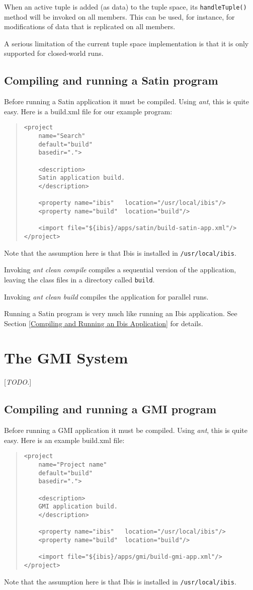 \documentclass[10pt]{article}
\newcommand{\mysection}[1]{\section{#1}\label{#1}}
\newcommand{\mysubsection}[1]{\subsection{#1}\label{#1}}
\newcommand{\remark}[1]{[\emph{#1}]}
\begin{document}
When an active tuple is added (as data) to the tuple space,
its \texttt{handleTuple()} method will be invoked on all members.
This can be used, for instance, for modifications of data that
is replicated on all members.

A serious limitation of the current tuple space implementation is that
it is only supported for closed-world runs.

\mysubsection{Compiling and running a Satin program}

Before running a Satin application it must be compiled.
Using \emph{ant}, this is quite easy. Here is a build.xml file for
our example program:

\begin{quote}
\begin{verbatim}
<project
    name="Search"
    default="build"
    basedir=".">

    <description>
    Satin application build.
    </description>

    <property name="ibis"   location="/usr/local/ibis"/>
    <property name="build"  location="build"/>

    <import file="${ibis}/apps/satin/build-satin-app.xml"/>
</project>
\end{verbatim}
\end{quote}
Note that the assumption here is that Ibis is installed in
\texttt{/usr/local/ibis}.

Invoking \emph{ant clean compile} compiles a sequential version
of the application, 
leaving the class files in a directory called \texttt{build}.

Invoking \emph{ant clean build} compiles the application for parallel
runs.

Running a Satin program is very much like running an Ibis application.
See Section \ref{Compiling and Running an Ibis Application} for details.

\mysection{The GMI System}

\remark{TODO.}

\mysubsection{Compiling and running a GMI program}

Before running a GMI application it must be compiled.
Using \emph{ant}, this is quite easy. Here is an example build.xml file:

\begin{quote}
\begin{verbatim}
<project
    name="Project name"
    default="build"
    basedir=".">

    <description>
    GMI application build.
    </description>

    <property name="ibis"   location="/usr/local/ibis"/>
    <property name="build"  location="build"/>

    <import file="${ibis}/apps/gmi/build-gmi-app.xml"/>
</project>
\end{verbatim}
\end{quote}
Note that the assumption here is that Ibis is installed in
\texttt{/usr/local/ibis}.
\end{document}
